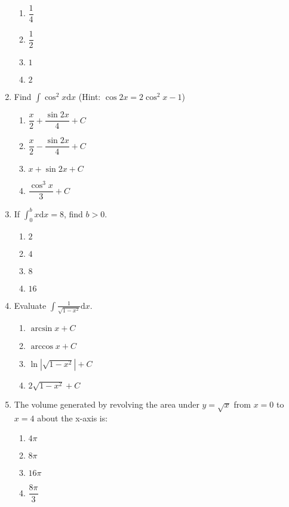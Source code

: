 \begin{multicols}{2}
\begin{enumerate}[label={\arabic*.}]
      \begin{enumerate}[label={\Alph*.}]
        \item \(\dfrac{1}{4}\)
        \item \(\dfrac{1}{2}\)
        \item \(1\)
        \item \(2\)
      \end{enumerate}
    \item Find \(\displaystyle \int \cos^2 x \mathrm{d}x\) (Hint: \(\cos 2x = 2\cos^2 x - 1\))
      \begin{enumerate}[label={\Alph*.}]
        \item \(\dfrac{x}{2} + \dfrac{\sin 2x}{4} + C\)
        \item \(\dfrac{x}{2} - \dfrac{\sin 2x}{4} + C\)
        \item \(x + \sin 2x + C\)
        \item \(\dfrac{\cos^3 x}{3} + C\)
      \end{enumerate}
    \item If \(\displaystyle \int_{0}^{b} x \mathrm{d}x = 8\), find \(b > 0\).
      \begin{enumerate}[label={\Alph*.}]
        \item \(2\)
        \item \(4\)
        \item \(8\)
        \item \(16\)
      \end{enumerate}
    \item Evaluate \(\displaystyle \int \frac{1}{\sqrt{1-x^2}} \mathrm{d}x\).
      \begin{enumerate}[label={\Alph*.}]
        \item \(\arcsin x + C\)
        \item \(\arccos x + C\)
        \item \(\ln|\sqrt{1-x^2}| + C\)
        \item \(2\sqrt{1-x^2} + C\)
      \end{enumerate}
    \item The volume generated by revolving the area under \(y=\sqrt{x}\) from \(x=0\) to \(x=4\) about the x-axis is:
      \begin{enumerate}[label={\Alph*.}]
        \item \(4\pi\)
        \item \(8\pi\)
        \item \(16\pi\)
        \item \(\dfrac{8\pi}{3}\)
      \end{enumerate}

\end{enumerate}
\end{multicols}
